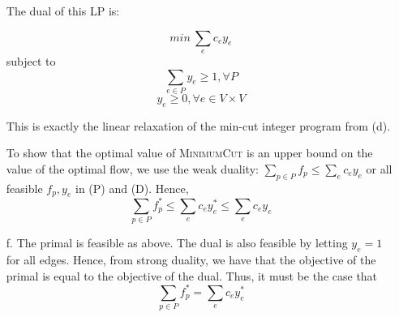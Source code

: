 \documentclass[11pt]{article}
\theoremstyle{remark}
\begin{document}
\begin{itemize}
The dual of this LP is:

$$min \ \sum_e c_e y_e$$
subject to 
$$\sum_{e\in P} y_e \geq 1, \forall P$$
$$y_e \geq 0, \forall e \in V\times V$$

This is exactly the linear relaxation of the min-cut integer program from (d).

To show that the optimal value of \textsc{MinimumCut} is an upper bound on the value of the optimal flow, we use the weak duality:
$\sum_{p\in P} f_p \leq \sum_e c_e y_e$ or all feasible $f_p,y_e$ in (P) and (D). Hence,
$$\sum_{p \in P} f^*_p \leq \sum_e c_e y^*_e \leq \sum_e c_e y_e$$

\item[f.]
The primal is feasible as above. The dual is also feasible by letting $y_e=1$ for all edges.
Hence, from strong duality, we have that the objective of the primal is equal to the objective of the dual. Thus, it must be the case that $$\sum_{p\in P} f_p^* = \sum_e c_e y_e^*$$

\end{itemize}
\color{black}
\end{document}
